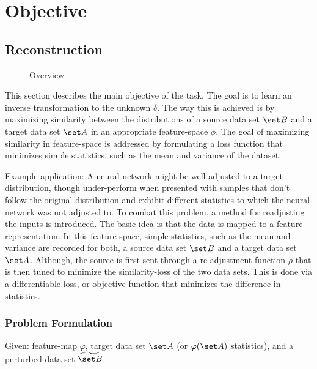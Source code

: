 \chapter{Objective}
\label{chap:Objective}





\section{Reconstruction}
\label{sec:Reconstruction}

\begin{figure}[h]
    
    \caption{Overview}
    \centering
\end{figure}

This section describes the main objective of the task.
The goal is to learn an inverse transformation to the unknown $\delta$.
The way this is achieved is by maximizing similarity between the distributions of a source data set $\set B$
and a target data set $\set A$ in an appropriate feature-space $\phi$.
The goal of maximizing similarity in feature-space is addressed by formulating a loss function
that minimizes simple statistics, such as the mean and variance of the dataset.

Example application:
A neural network might be well adjusted to a target distribution, 
though under-perform when presented with samples that don't follow the original distribution
and exhibit different statistics to which the neural network was not adjusted to.
To combat this problem, a method for readjusting the inputs is introduced.
The basic idea is that the data is mapped to a feature-representation.
In this feature-space, simple statistics, such as the mean and variance are recorded
for both, a source data set $\set B$ and a target data set $\set A$.
Although, the source is first sent through a re-adjustment function $\rho$ that is
then tuned to minimize the similarity-loss of the two data sets.
This is done via a differentiable loss, or objective function that minimizes the difference in statistics.



\subsection{Problem Formulation}
Given: feature-map $\varphi$, target data set $\set A$ (or $\varphi(\set A)$ statistics), and a perturbed data set $\widetilde {\set B}$

